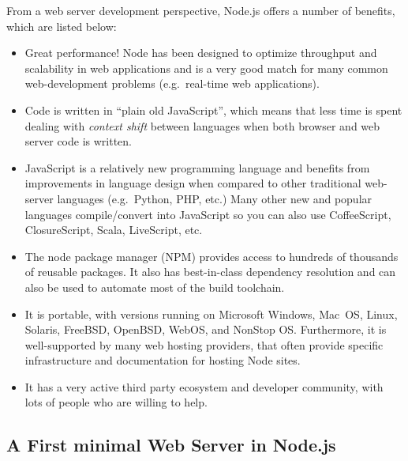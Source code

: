 \documentclass[a4paper, justified, notoc]{tufte-handout} %
\begin{document}
From a web server development perspective, Node.js offers a number of benefits, which are listed below:
\begin{itemize}
	\item Great performance! Node has been designed to optimize throughput and scalability in web applications and is a very good match for many common web-development problems (e.g.\ real-time web applications).
	\item Code is written in ``plain old JavaScript'', which means that less time is spent dealing with \emph{context shift} between languages when both browser and web server code is written.
	\item JavaScript is a relatively new programming language and benefits from improvements in language design when compared to other traditional web-server languages (e.g.\ Python, PHP, etc.) Many other new and popular languages compile/convert into JavaScript so you can also use CoffeeScript, ClosureScript, Scala, LiveScript, etc.
	\item The node package manager (NPM) provides access to hundreds of thousands of reusable packages. It also has best-in-class dependency resolution and can also be used to automate most of the build toolchain.
	\item It is portable, with versions running on Microsoft Windows, Mac~OS, Linux, Solaris, FreeBSD, OpenBSD, WebOS, and NonStop OS. Furthermore, it is well-supported by many web hosting providers, that often provide specific infrastructure and documentation for hosting Node sites.
	\item It has a very active third party ecosystem and developer community, with lots of people who are willing to help.
\end{itemize}




\subsection{A First minimal Web Server in Node.js} %
\label{sub:a_first_minimal_web_server_in_node}

\end{document}

